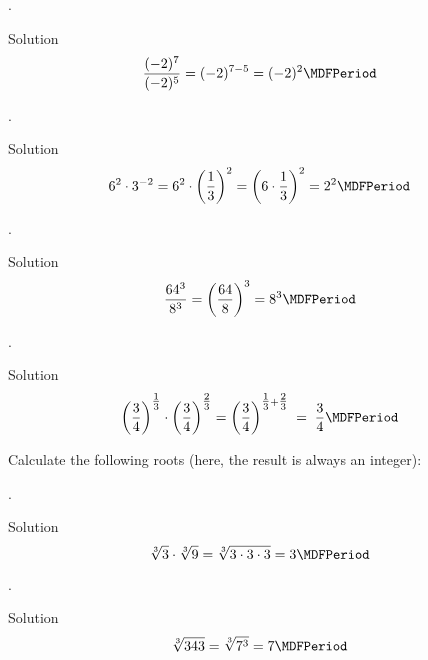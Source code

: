 \begin{MExercises}
\begin{MExercise}
\begin{MExerciseItems}
\item{.\\\begin{MHint}{Solution} $$\Mdfrac{(-2)^7}{(-2)^5}=(-2)^{7-5}=(-2)^2 \MDFPeriod$$\end{MHint}}
\item{.\\\begin{MHint}{Solution} $$6^2\cdot 3^{-2}=6^2\cdot \left({\Mdfrac13}\right)^{2}=\left({6\cdot\Mdfrac13}\right)^2=2^2 \MDFPeriod$$\end{MHint}}
\item{.\\\begin{MHint}{Solution} $$\Mdfrac{64^3}{8^3}=\left({\Mdfrac{64}{8}}\right)^3=8^3 \MDFPeriod$$\end{MHint}}
\item{.\\
\begin{MHint}{Solution}
$$
\left(\Mdfrac34\right)^{\Mtfrac13}\cdot\left(\Mdfrac34\right)^{\Mtfrac23} = \left(\Mdfrac34\right)^{\Mtfrac13+\Mtfrac23} \;=\; \Mdfrac34  \MDFPeriod
$$
\end{MHint}}
\end{MExerciseItems}
\end{MExercise}

\begin{MExercise}
Calculate the following roots (here, the result is always an integer):

\begin{MExerciseItems}
\item{.\\\begin{MHint}{Solution} $$\sqrt[3]{3}\cdot \sqrt[3]{9}=\sqrt[3]{3\cdot 3\cdot 3}=3 \MDFPeriod$$\end{MHint}}
\item{.\\\begin{MHint}{Solution} $$\sqrt[3]{343}=\sqrt[3]{7^3}=7 \MDFPeriod$$\end{MHint}}
\end{MExerciseItems}
\end{MExercise}


\end{MExercises}
